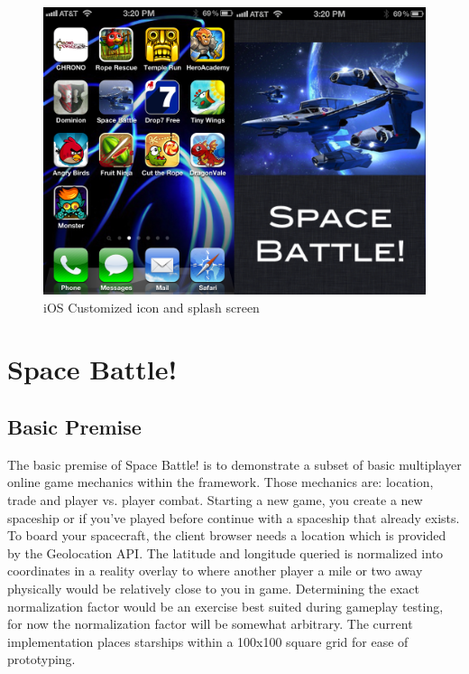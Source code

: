 \documentclass[12pt]{report}	%
\theoremstyle{definition}
\theoremstyle{remark}
\begin{document}
\begin{figure}[h!]
\centering
\includegraphics[scale=0.35]{2.png}
\caption{iOS Customized icon and splash screen}
\label{ioscustom}
\end{figure}

\chapter{Space Battle!}

\section{Basic Premise}

The basic premise of Space Battle! is to demonstrate a subset of basic
multiplayer online game mechanics within the framework. Those mechanics
are: location, trade and player vs. player combat. Starting a new game,
you create a new spaceship or if you've played before continue with a
spaceship that already exists. To board your spacecraft, the client
browser needs a location which is provided by the Geolocation API. The
latitude and longitude queried is normalized into coordinates in a
reality overlay to where another player a mile or two away physically
would be relatively close to you in game. Determining the exact
normalization factor would be an exercise best suited during gameplay
testing, for now the normalization factor will be somewhat arbitrary.
The current implementation places starships within a 100x100 square grid
for ease of prototyping.
\end{document}
